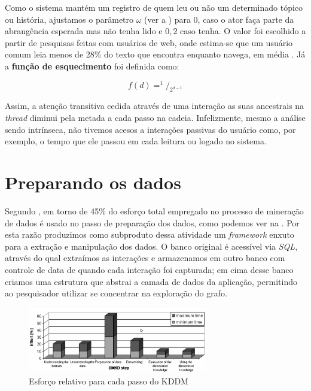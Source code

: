 Como o sistema mantém um registro de quem leu ou não um determinado tópico ou
história, ajustamos o parâmetro $\omega$ (ver a ) para 0,
caso o ator faça parte da abrangência esperada mas não tenha lido e $0,2$ caso
tenha. O valor foi escolhido a partir de pesquisas feitas com usuários de web,
onde estima-se que um usuário comum leia menos de 28\% do texto que encontra
enquanto navega, em média \citep{Weinreich2008, Nielsen2008}. Já a \textbf{função
de esquecimento} foi definida como:

\begin{equation}
f(d) = ^1/_{2^{d-1}}
\end{equation}

Assim, a atenção transitiva cedida através de uma interação as suas
ancestrais na \emph{thread} diminui pela metada a cada passo na cadeia.
Infelizmente, mesmo a análise sendo intrínseca, não tivemos acesos a interações
passivas do usuário como, por exemplo, o tempo que ele passou em cada leitura
ou logado no sistema.

\section{Preparando os dados}
\label{ap:sec:preparacao}

Segundo \citet{Cios2005}, em torno de 45\% do esforço total empregado no
processo de mineração de dados é usado no passo de preparação dos dados, como
podemos ver na . Por esta razão produzimos como
subproduto dessa atividade um \emph{framework} enxuto para a extração e
manipulação dos dados. O banco original é acessível via \emph{SQL}, através do
qual extraímos as interações e armazenamos em outro banco com controle de data
de quando cada interação foi capturada; em cima desse banco criamos uma
estrutura que abstrai a camada de dados da aplicação, permitindo ao pesquisador
utilizar se concentrar na exploração do grafo.

\begin{figure}[h!]
  \centering
    \includegraphics[width=0.7\textwidth]{imgs/preparation-time.png}
  \caption{Esforço relativo para cada passo do KDDM \citep{Cios2005}}
    \label{ap:fig:esforco}
\end{figure}

